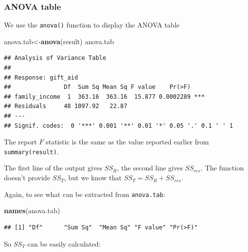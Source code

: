 \documentclass[
]{book}
\newenvironment{Shaded}{\begin{snugshade}}{\end{snugshade}}
\newcommand{\FunctionTok}[1]{\textcolor[rgb]{0.13,0.29,0.53}{\textbf{#1}}}
\newcommand{\NormalTok}[1]{#1}
\newcommand{\OtherTok}[1]{\textcolor[rgb]{0.56,0.35,0.01}{#1}}
\newcommand{\SpecialCharTok}[1]{\textcolor[rgb]{0.81,0.36,0.00}{\textbf{#1}}}
\newcommand{\StringTok}[1]{\textcolor[rgb]{0.31,0.60,0.02}{#1}}
\begin{document}
\hypertarget{anova-table-1}{%
\subsubsection*{ANOVA table}\label{anova-table-1}}

We use the \texttt{anova()} function to display the ANOVA table

\begin{Shaded}
\begin{Highlighting}[]
\NormalTok{anova.tab}\OtherTok{\textless{}{-}}\FunctionTok{anova}\NormalTok{(result)}
\NormalTok{anova.tab}
\end{Highlighting}
\end{Shaded}

\begin{verbatim}
## Analysis of Variance Table
## 
## Response: gift_aid
##               Df  Sum Sq Mean Sq F value    Pr(>F)    
## family_income  1  363.16  363.16  15.877 0.0002289 ***
## Residuals     48 1097.92   22.87                      
## ---
## Signif. codes:  0 '***' 0.001 '**' 0.01 '*' 0.05 '.' 0.1 ' ' 1
\end{verbatim}

The report \(F\) statistic is the same as the value reported earlier from \texttt{summary(result)}.

The first line of the output gives \(SS_{R}\), the second line gives \(SS_{res}\). The function doesn't provide \(SS_T\), but we know that \(SS_T = SS_{R} + SS_{res}\).

Again, to see what can be extracted from \texttt{anova.tab}:

\begin{Shaded}
\begin{Highlighting}[]
\FunctionTok{names}\NormalTok{(anova.tab)}
\end{Highlighting}
\end{Shaded}

\begin{verbatim}
## [1] "Df"      "Sum Sq"  "Mean Sq" "F value" "Pr(>F)"
\end{verbatim}

So \(SS_T\) can be easily calculated:

\begin{Shaded}
\end{Shaded}
\end{document}
